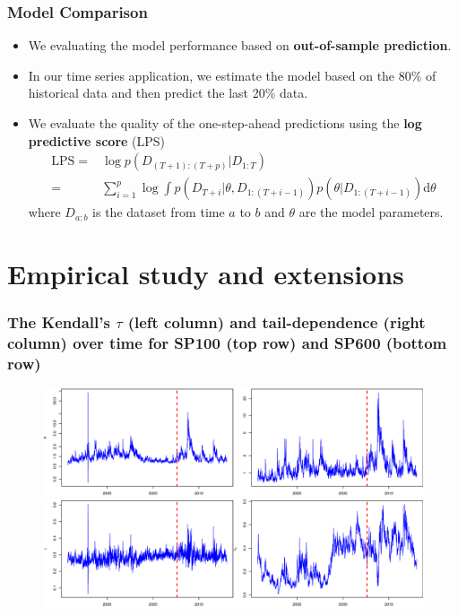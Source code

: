 \documentclass{beamer}
\begin{document}
\begin{frame}
\frametitle{Model Comparison}
  \begin{itemize}
  \item We evaluating the model performance based on \textbf{out-of-sample prediction}.
  \item In our time series application, we estimate the model based on the 80\% of
    historical data and then predict the last 20\% data.

  \item We evaluate the quality of the one-step-ahead predictions using the \textbf{log
      predictive score} (LPS)
\begin{align*}
\mathrm{LPS}=&\log p(D_{(T+1):(T+p)}|D_{1:T})\\
               =&\sum\nolimits _{i=1}^{p}\log\int p(D_{T+i}|\theta,D_{1:(T+i-1)})p(\theta|D_{1:(T+i-1)})\mathrm{d}\theta
\end{align*}
where $D_{a:b}$ is the dataset from time $a$ to $b$ and $\theta$ are the model
parameters.
  \end{itemize}
\end{frame}


\section{Empirical study and extensions}

\begin{frame}[plain]
  \addtocounter{framenumber}{-1}

  \begin{center}
    {\Large {}}
  \end{center}
\end{frame}

\begin{frame}
  \frametitle{The Kendall's $\tau$ (left column) and tail-dependence (right column) over
    time for SP100 (top row) and SP600 (bottom row)}
  \begin{figure}
    \centering
    \hspace{-1cm}\includegraphics[height=0.4\textheight]{var-post}\\
    \hspace{-1cm}\includegraphics[height=0.41\textheight]{tau-post}
  \end{figure}
\end{frame}
\end{document}

